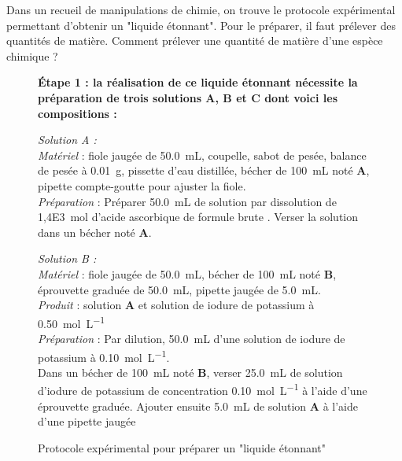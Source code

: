 \documentclass[a4paper,12pt,fleqn]{article}%
\begin{document}
	\maketitle
	Dans un recueil de manipulations de chimie, on trouve le protocole expérimental permettant d'obtenir un "liquide étonnant". Pour le préparer, il faut prélever des quantités de matière. Comment prélever une quantité de matière d'une espèce chimique ?
	
	\begin{figure}[h!]
		\caption{Protocole expérimental pour préparer un "liquide étonnant"}
		\label{doc1}
		\textbf{Étape 1 : la réalisation de ce liquide étonnant nécessite la préparation de trois solutions A, B et C dont voici les compositions :}\\
		
		\begin{minipage}{.48\linewidth}
			\emph{Solution A :}\\
			
			\textit{Matériel} : fiole jaugée de \SI{50,0}{mL}, coupelle, sabot de pesée, balance de pesée à \SI{0,01}{g}, pissette d'eau distillée, bécher de \SI{100}{mL} noté \textbf{A}, pipette compte-goutte pour ajuster la fiole.\\
			\textit{Préparation} : Préparer \SI{50,0}{mL} de solution par dissolution de \SI{1,4E3}{\mole} d'acide ascorbique de formule brute . Verser la solution dans un bécher noté \textbf{A}.
		\end{minipage}\hspace{.02\linewidth}
		\begin{minipage}{.48\linewidth}
			\emph{Solution B :}\\
			
			\textit{Matériel} : fiole jaugée de \SI{50,0}{mL}, bécher de \SI{100}{mL} noté \textbf{B}, éprouvette graduée de \SI{50,0}{mL}, pipette jaugée de \SI{5,0}{mL}.\\
			\textit{Produit} : solution \textbf{A} et solution de iodure de potassium à \SI{0,50}{\mole\per\liter}\\
			\textit{Préparation} : Par dilution,  \SI{50,0}{mL} d'une solution de iodure de potassium à \SI{0,10}{\mole\per\liter}.\\
			Dans un bécher de \SI{100}{mL} noté \textbf{B}, verser \SI{25,0}{mL} de solution d’iodure de potassium de concentration \SI{0,10}{\mole\per\liter} à l’aide d’une éprouvette graduée. Ajouter ensuite \SI{5,0}{mL} de solution \textbf{A}
			à l’aide d’une pipette jaugée
		\end{minipage}
		

\end{figure}
\end{document}
